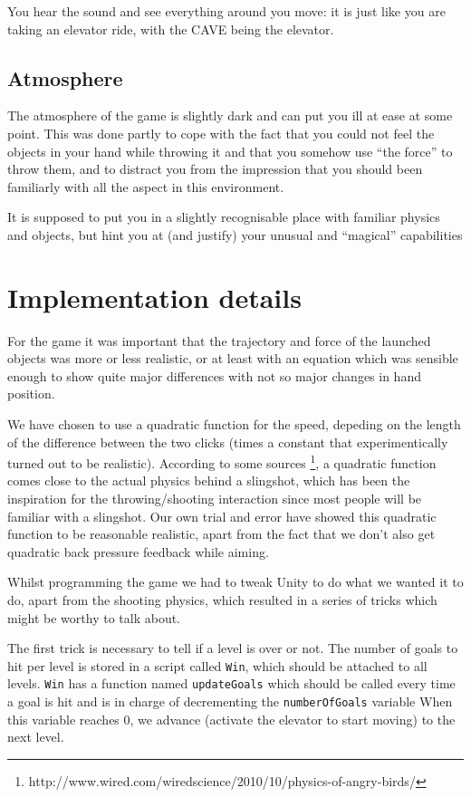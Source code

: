 \documentclass[a4paper]{article}
\begin{document}
You hear the sound and see everything around you move: it is just like you are taking
an elevator ride, with the CAVE being the elevator.

\subsection{Atmosphere}
The atmosphere of the game is slightly dark and can put you ill at ease at some
point. This was done partly to cope with the fact that you could not feel the objects
in your hand while throwing it and that you somehow use “the force” to throw them,
and to distract you from the impression that you should been familiarly with all the
aspect in this environment.

It is supposed to put you in a slightly recognisable place with familiar physics and
objects, but hint you at (and justify) your unusual and ``magical'' capabilities


\section{Implementation details}
\label{sec:inner}
For the game it was important that the trajectory and force of the launched objects was
more or less realistic, or at least with an equation which was sensible enough
to show quite major differences with not so major changes in hand position.

We have chosen to use a quadratic function for the speed, depeding on the length
of the difference between the two clicks (times a constant that experimentically
turned out to be realistic). According to some sources
\footnote{http://www.wired.com/wiredscience/2010/10/physics-of-angry-birds/},
a quadratic function comes close to the actual physics behind a slingshot, which
has been the inspiration for the throwing/shooting interaction since most people
will be familiar with a slingshot. Our own trial and error have showed this quadratic
function to be reasonable realistic, apart from the fact that we don't also get
quadratic back pressure feedback while aiming.

Whilst programming the game we had to tweak Unity to do what we wanted it to do,
apart from the shooting physics, which resulted in a series of tricks which might
be worthy to talk about.

The first trick is necessary to tell if a level is over or not. The number of goals to
hit per level is stored in a script called \verb!Win!, which should be attached to
all levels. \verb!Win! has a function named \verb!updateGoals! which should be called
every time a goal is hit and is in charge of decrementing the \verb!numberOfGoals! variable
When this variable reaches 0, we advance (activate the elevator to start moving) to the
next level.
\end{document}
